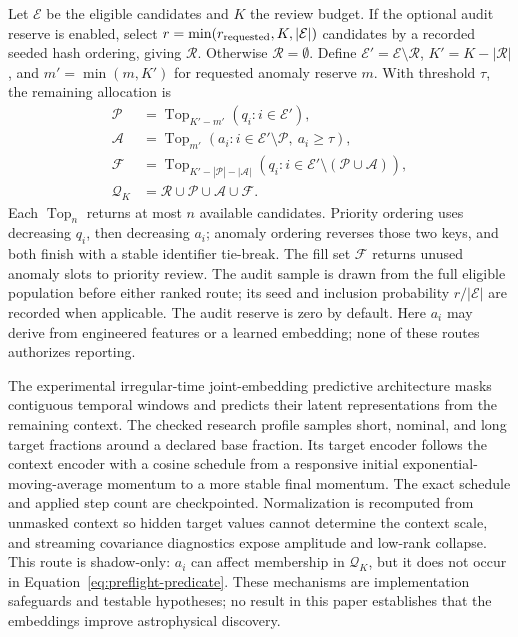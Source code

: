 \documentclass[11pt]{article}
\begin{document}
Let $\mathcal{E}$ be the eligible candidates and $K$ the review budget. If the optional audit reserve is enabled, select $r=\min(r_{\rm requested},K,|\mathcal{E}|)$ candidates by a recorded seeded hash ordering, giving $\mathcal{R}$. Otherwise $\mathcal{R}=\emptyset$. Define $\mathcal{E}'=\mathcal{E}\setminus\mathcal{R}$, $K'=K-|\mathcal{R}|$, and $m'=\min(m,K')$ for requested anomaly reserve $m$. With threshold $\tau$, the remaining allocation is
\begin{equation}
\begin{aligned}
\mathcal{P} &= \operatorname{Top}_{K'-m'}(q_i:i\in\mathcal{E}'),\\
\mathcal{A} &= \operatorname{Top}_{m'}(a_i:i\in\mathcal{E}'\setminus\mathcal{P},\ a_i\geq\tau),\\
\mathcal{F} &= \operatorname{Top}_{K'-|\mathcal{P}|-|\mathcal{A}|}
(q_i:i\in\mathcal{E}'\setminus(\mathcal{P}\cup\mathcal{A})),\\
\mathcal{Q}_K &= \mathcal{R}\cup\mathcal{P}\cup\mathcal{A}\cup\mathcal{F}.
\end{aligned}
\label{eq:queue-allocation}
\end{equation}
Each $\operatorname{Top}_n$ returns at most $n$ available candidates. Priority ordering uses decreasing $q_i$, then decreasing $a_i$; anomaly ordering reverses those two keys, and both finish with a stable identifier tie-break. The fill set $\mathcal{F}$ returns unused anomaly slots to priority review. The audit sample is drawn from the full eligible population before either ranked route; its seed and inclusion probability $r/|\mathcal{E}|$ are recorded when applicable. The audit reserve is zero by default. Here $a_i$ may derive from engineered features or a learned embedding; none of these routes authorizes reporting.

The experimental irregular-time joint-embedding predictive architecture masks contiguous temporal windows and predicts their latent representations from the remaining context. The checked research profile samples short, nominal, and long target fractions around a declared base fraction. Its target encoder follows the context encoder with a cosine schedule from a responsive initial exponential-moving-average momentum to a more stable final momentum. The exact schedule and applied step count are checkpointed. Normalization is recomputed from unmasked context so hidden target values cannot determine the context scale, and streaming covariance diagnostics expose amplitude and low-rank collapse. This route is shadow-only: $a_i$ can affect membership in $\mathcal{Q}_K$, but it does not occur in Equation~\ref{eq:preflight-predicate}. These mechanisms are implementation safeguards and testable hypotheses; no result in this paper establishes that the embeddings improve astrophysical discovery.
\end{document}
